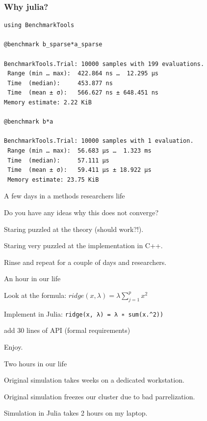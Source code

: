 \documentclass{beamer}
\newcommand{\monob}[1]{\mbox{\texttt{\textcolor{mypurple}{#1}}}}
\newenvironment{wideitemize}{
    \itemize\addtolength{\itemsep}{15pt}\addtolength{\topsep}{10pt}}{\enditemize}
\begin{document}
            \begin{frame}[fragile]
        \frametitle{Why julia?}
        \vspace{0.5cm}
        \begin{lstlisting}[language=JuliaLocal, style=julia,
        basicstyle=\scriptsize\JuliaMonoRegular]
using BenchmarkTools

@benchmark b_sparse*a_sparse

BenchmarkTools.Trial: 10000 samples with 199 evaluations.
 Range (min … max):  422.864 ns …  12.295 μs
 Time  (median):     453.877 ns
 Time  (mean ± σ):   566.627 ns ± 648.451 ns
Memory estimate: 2.22 KiB

@benchmark b*a

BenchmarkTools.Trial: 10000 samples with 1 evaluation.
 Range (min … max):  56.683 μs …  1.323 ms
 Time  (median):     57.111 μs
 Time  (mean ± σ):   59.411 μs ± 18.922 μs
 Memory estimate: 23.75 KiB
\end{lstlisting}
    \end{frame}


    \begin{frame}{A few days in a methods researchers life}
        \begin{wideitemize}
        \item Do you have any ideas why this does not converge?
        \item Staring puzzled at the theory (should work?!).
        \item Staring very puzzled at the implementation in C++.
        \item Rinse and repeat for a couple of days and researchers.
        \end{wideitemize}
    \end{frame}

    \begin{frame}{An hour in our life}
      \begin{wideitemize}
        \item Look at the formula: $ridge(x, \lambda{}) = \lambda{}\sum^p_{j=1}x^2$
        \item Implement in Julia: \monob{ridge(x, λ) = λ ∗ sum(x.\^{}2))}
        \item add 30 lines of API (formal requirements)
        \item Enjoy.
      \end{wideitemize}
    \end{frame}

    \begin{frame}{Two hours in our life}
        \begin{wideitemize}
        \item Original simulation takes weeks on a dedicated workstation.
        \item Original simulation freezes our cluster due to bad parrelization.
        \item Simulation in Julia takes 2 hours on my laptop.
        \end{wideitemize}
    \end{frame}
\end{document}
